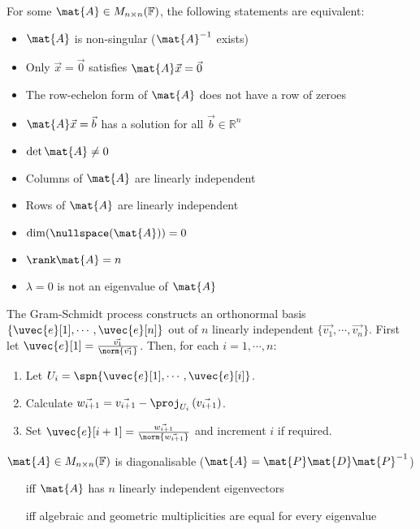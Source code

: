 \documentclass[10pt, a4paper]{article}
\newlength{\interwordspace}
\begin{document}
\begin{multicols}{2}
    For some \(\mat{A} \in M_{n \times n}(\mathbb{F})\), the following statements are equivalent:
    \begin{itemize}
        \item \(\mat{A}\) is non-singular (\(\mat{A}^{-1}\) exists)
        \item Only \(\vec{x} = \vec{0}\) satisfies \(\mat{A} \vec{x} = \vec{0}\)
        \item The row-echelon form of \(\mat{A}\) does not have a row of zeroes
        \item \(\mat{A} \vec{x} = \vec{b}\) has a solution for all \(\vec{b} \in \mathbb{R}^n\)
        \item \(\det \mat{A} \neq 0\)
        \item Columns of \(\mat{A}\) are linearly independent
        \item Rows of \(\mat{A}\) are linearly independent
        \item \(\dim(\nullspace(\mat{A})) = 0\)
        \item \(\rank \mat{A} = n\)
        \item \(\lambda = 0\) is not an eigenvalue of \(\mat{A}\)
    \end{itemize}
    \vfill\columnbreak
    The Gram-Schmidt process constructs an orthonormal basis \(\{\uvec{e}[1], \cdots, \uvec{e}[n]\}\) out of \(n\) linearly
    independent \(\{\vec{v_1}, \cdots, \vec{v_n}\}\). First let \(\uvec{e}[1] = \frac{\vec{v_1}}{\norm{\vec{v_1}}}\).
    Then, for each \(i = 1, \cdots{}, n\):
    \begin{enumerate}
        \item Let \(U_i = \spn \{\uvec{e}[1], \cdots, \uvec{e}[i]\}\).
        \item Calculate \(\vec{w_{i+1}} = \vec{v_{i+1}} - \proj_{U_{i}} \left(\vec{v_{i+1}}\right)\).
        \item Set \(\uvec{e}[i+1] = \frac{\vec{w_{i+1}}}{\norm{\vec{w_{i+1}}}}\) and increment \(i\) if required.
    \end{enumerate}
    \(\mat{A} \in M_{n \times n}(\mathbb{F})\) is diagonalisable (\(\mat{A} = \mat{P}\mat{D}\mat{P}^{-1}\))
    \begin{itemize}[leftmargin=0.87cm, labelsep=\interwordspace]
        \item[iff] \(\mat{A}\) has \(n\) linearly independent eigenvectors
        \item[iff] algebraic and geometric multiplicities are equal for every eigenvalue
    \end{itemize}


\end{multicols}
\end{document}
